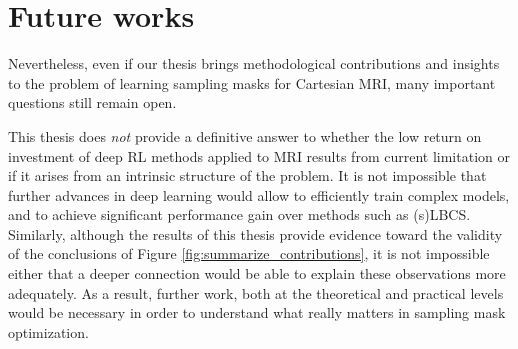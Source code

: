 

\section*{Future works}
Nevertheless, even if our thesis brings methodological contributions and insights to the problem of learning sampling masks for Cartesian MRI, many important questions still remain open. 


This thesis does \textit{not} provide a definitive answer to whether the low return on investment of deep RL methods applied to MRI results from current limitation or if it arises from an intrinsic structure of the problem. It is not impossible that further advances in deep learning would allow to efficiently train complex models, and to achieve significant performance gain over methods such as (s)LBCS. Similarly, although the results of this thesis provide evidence toward the validity of the conclusions of Figure \ref{fig:summarize_contributions}, it is not impossible either that a deeper connection would be able to explain these observations more adequately. As a result, further work, both at the theoretical and practical levels would be necessary in order to understand what really matters in sampling mask optimization.

